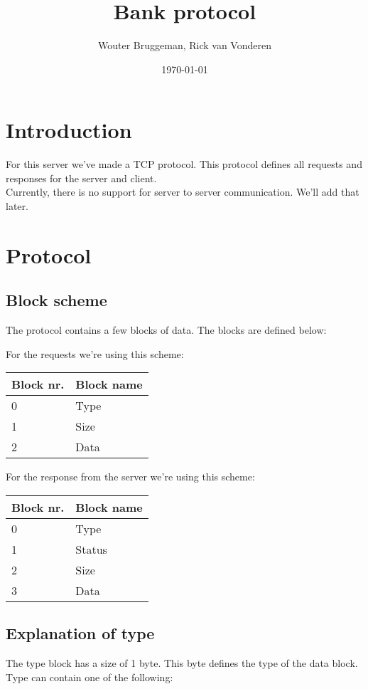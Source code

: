 \documentclass[12pt]{article}
\title{Bank protocol}
\author{Wouter Bruggeman, Rick van Vonderen}
\date{\today}
\begin{document}
\maketitle
\newpage

\tableofcontents
\newpage

\section{Introduction}
For this server we've made a TCP protocol. This protocol defines all requests
and responses for the server and client.\\
Currently, there is no support for server to server communication. We'll add that later.
\newpage

\section{Protocol} \label{hfst:protocol}
\subsection{Block scheme} \label{hfst:scheme}
The protocol contains a few blocks of data. The blocks are defined below:

For the requests we're using this scheme:\\
\begin{tabular}{| p{2cm} | p{5cm} |}
	\hline
	\textbf{Block nr.} & \textbf{Block name} \\ \hline
	0 & Type \\ \hline
	1 & Size \\ \hline
	2 & Data \\ \hline
\end{tabular}

For the response from the server we're using this scheme:\\
\begin{tabular}{| p{2cm} | p{5cm} |}
	\hline
	\textbf{Block nr.} & \textbf{Block name} \\ \hline
	0 & Type \\ \hline
	1 & Status \\ \hline
	2 & Size \\ \hline
	3 & Data \\ \hline
\end{tabular}

\subsection{Explanation of type} \label{hfst:type}
The type block has a size of 1 byte. This byte defines the type of the data block.\\
Type can contain one of the following:
\end{document}
